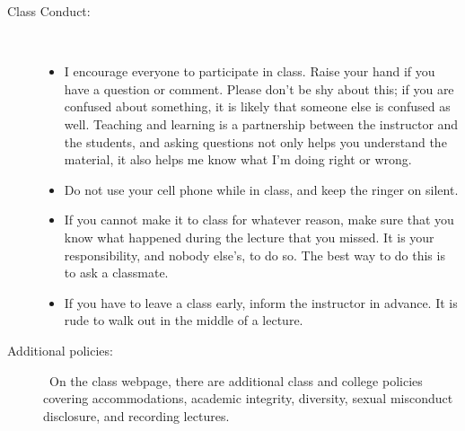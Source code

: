 \documentclass [letterpaper,11pt]{article}
\begin{document}
\begin{description}
\item[Class Conduct:] \
   \begin{itemize}\setlength{\itemsep}{0em}\setlength{\parskip}{0pt}
   	\item I encourage everyone to participate in class.  Raise your hand if you have
	a question or comment.  Please don't be shy about this; if you are confused about
	something, it is likely that someone else is confused as well.
		Teaching and learning is a partnership between the instructor and the students, and asking questions not only helps you understand the material, it also
		helps me know what I'm doing right or wrong.
			     \item Do not use your cell phone while in class, and 
			     keep the ringer on silent.
			          \item  If you cannot make it to class for whatever reason, make sure that
       you know what happened during the lecture that you missed. It is
       your responsibility, and nobody else's, to do so.  The best way to do this is
       to ask a classmate.  
     \item  If you have to leave a class early, inform the instructor in
       advance. It is rude to walk out in the middle of a
       lecture. 
     \end{itemize}
     
\item[Additional policies:] \
On the class webpage, there are additional class and college policies covering accommodations, academic integrity, diversity, sexual misconduct disclosure,
and recording lectures.  
   
   
\end{description}

   
\end{document}
